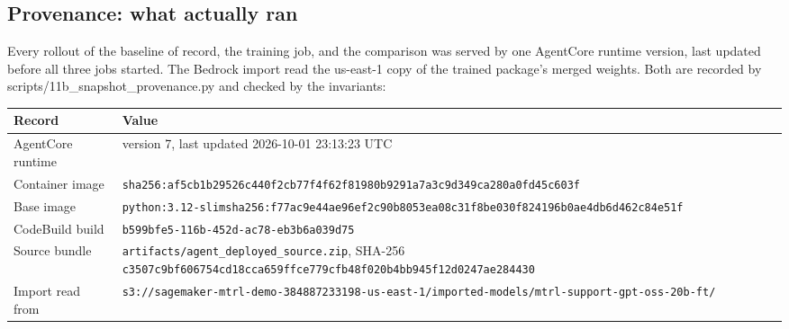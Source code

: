 \documentclass[11pt]{article}
\begin{document}
\subsection{Provenance: what actually ran}
Every rollout of the baseline of record, the training job, and the comparison was served by one AgentCore runtime version, last updated before all three jobs started. The Bedrock import read the us-east-1 copy of the trained package's merged weights. Both are recorded by scripts/11b\_snapshot\_provenance.py and checked by the invariants:
\begin{center}
\begin{minipage}{\linewidth}\centering
\begin{tabular}{P{3.4cm}P{12cm}}
\toprule
\textbf{Record} & \textbf{Value} \\
\midrule
AgentCore runtime & version 7, last updated 2026-10-01 23:13:23 UTC \\
Container image & \texttt{\scriptsize sha256:af5cb1b29526c440f2cb77f4f62f81980b9291a7a3c9d349ca280a0fd45c603f} \\
Base image & \texttt{\scriptsize python:3.12-slim}\newline \texttt{\scriptsize sha256:f77ac9e44ae96ef2c90b8053ea08c31f8be030f824196b0ae4db6d462c84e51f} \\
CodeBuild build & \texttt{\scriptsize b599bfe5-116b-452d-ac78-eb3b6a039d75} \\
Source bundle & \texttt{artifacts/agent\_deployed\_source.zip}, SHA-256 \texttt{\scriptsize c3507c9bf606754cd18cca659ffce779cfb48f020b4bb945f12d0247ae284430} \\
Import read from & \nolinkurl{s3://sagemaker-mtrl-demo-384887233198-us-east-1/imported-models/mtrl-support-gpt-oss-20b-ft/} \\
\bottomrule
\end{tabular}
\end{minipage}
\end{center}
\end{document}
